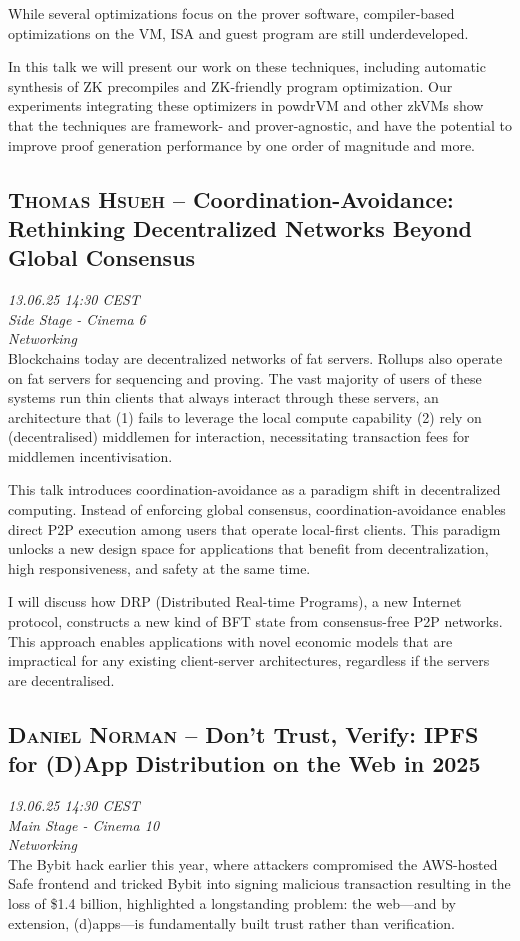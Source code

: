 While several optimizations focus on the prover software, compiler-based
optimizations on the VM, ISA and guest program are still underdeveloped.

In this talk we will present our work on these techniques, including automatic
synthesis of ZK precompiles and ZK-friendly program optimization. Our
experiments integrating these optimizers in powdrVM and other zkVMs show that
the techniques are framework- and prover-agnostic, and have the potential to
improve proof generation performance by one order of magnitude and more.

\clearpage
\subsection {\textsc{Thomas Hsueh}  -- Coordination-Avoidance: Rethinking Decentralized Networks Beyond Global Consensus} \noindent \textit {13.06.25 14:30 CEST\\ Side Stage - Cinema 6\\ Networking}\\[1em] Blockchains today are decentralized networks of fat servers. Rollups also operate on fat servers for sequencing and proving. The vast majority of users of these systems run thin clients that always interact through these servers, an architecture that (1) fails to leverage the local compute capability (2) rely on (decentralised) middlemen for interaction, necessitating transaction fees for middlemen incentivisation.

This talk introduces coordination-avoidance as a paradigm shift in decentralized computing. Instead of enforcing global consensus, coordination-avoidance enables direct P2P execution among users that operate local-first clients. This paradigm unlocks a new design space for applications that benefit from decentralization, high responsiveness, and safety at the same time.

I will discuss how DRP (Distributed Real-time Programs), a new Internet protocol, constructs a new kind of BFT state from consensus-free P2P networks. This approach enables applications with novel economic models that are impractical for any existing client-server architectures, regardless if the servers are decentralised.

\clearpage
\subsection {\textsc{Daniel Norman}  -- Don’t Trust, Verify: IPFS for (D)App Distribution on the Web in 2025} \noindent \textit {13.06.25 14:30 CEST\\ Main Stage - Cinema 10\\ Networking}\\[1em] The Bybit hack earlier this year, where attackers compromised the AWS-hosted Safe frontend and tricked Bybit into signing malicious transaction resulting in the loss of \$1.4 billion, highlighted a longstanding problem: the web—and by extension, (d)apps—is fundamentally built trust rather than verification.

